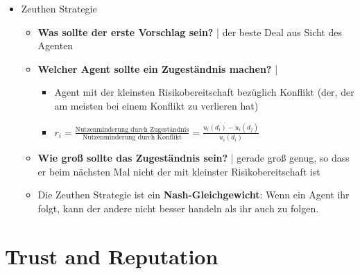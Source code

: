 \documentclass{article} %
\begin{document}
\begin{itemize}
		\item Zeuthen Strategie
		\begin{itemize}
			\item \textbf{Was sollte der erste Vorschlag sein?} | der beste Deal aus Sicht des Agenten
			\item \textbf{Welcher Agent sollte ein Zugeständnis machen?} | \begin{itemize}
				\item Agent mit der kleinsten Risikobereitschaft bezüglich Konflikt (der, der am meisten bei einem Konflikt zu verlieren hat)
				\item $r_i = \frac{\text{Nutzenminderung durch Zugeständnis}}{\text{Nutzenminderung durch Konflikt}} = \frac{u_i(d_i) - u_i(d_j)}{u_i(d_i)}$
			\end{itemize}
			\item \textbf{Wie groß sollte das Zugeständnis sein?} | gerade groß genug, so dass er beim nächsten Mal nicht der mit kleinster Risikobereitschaft ist
			\item Die Zeuthen Strategie ist ein \textbf{Nash-Gleichgewicht}: Wenn ein Agent ihr folgt, kann der andere nicht besser handeln als ihr auch zu folgen.
		\end{itemize}
	\end{itemize}
	\section{Trust and Reputation}
\end{document}
